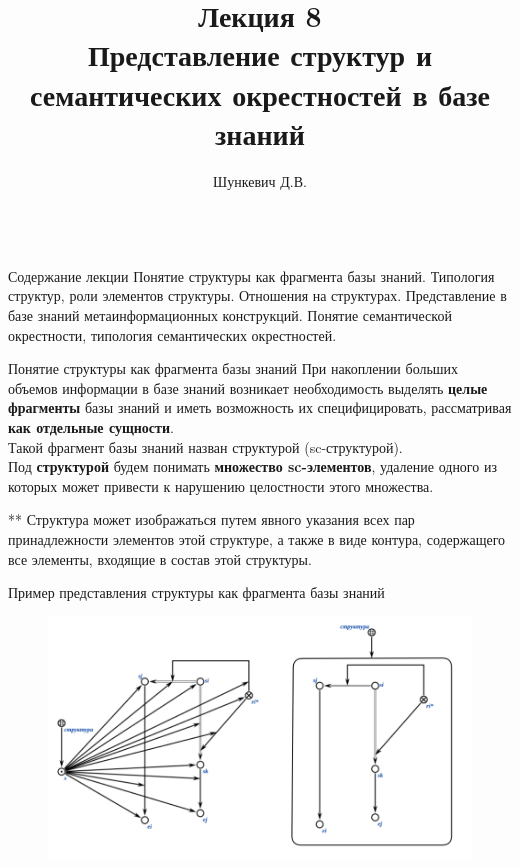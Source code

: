 \title{Лекция 8\\Представление структур и семантических окрестностей в базе знаний}   
\author[]{Шункевич Д.В.}

\begin{frame}
	\titlepage
\end{frame}

\begin{frame}{\\Содержание лекции}
	\topline
	\justifying
	Понятие структуры как фрагмента базы знаний. Типология структур, роли элементов структуры. Отношения на структурах. Представление в базе знаний метаинформационных конструкций. Понятие семантической окрестности, типология семантических окрестностей.
\end{frame}

\begin{frame}{Понятие структуры как фрагмента базы знаний}
	\topline
	\justifying
	При накоплении больших	объемов информации в базе знаний возникает необходимость выделять \textbf{целые фрагменты} базы знаний и иметь возможность их специфицировать, рассматривая \textbf{как отдельные сущности}.\\
	Такой фрагмент базы знаний назван структурой (sc-структурой).\\
	Под \textbf{структурой} будем понимать \textbf{множество
	sc-элементов}, удаление одного из которых может привести к нарушению целостности этого множества.
\end{frame}

\begin{frame}{**}
	\topline
	\justifying
	Структура может изображаться путем явного указания всех пар принадлежности элементов этой структуре, а также в виде контура, содержащего все элементы, входящие в состав этой структуры.
\end{frame}

\begin{frame}{Пример представления структуры как фрагмента базы знаний}
	\topline
	\justifying
	\begin{figure}[H]
		\includegraphics[scale=0.33]{./figures/sd_structures/structure.png}
	\end{figure}
\end{frame}

